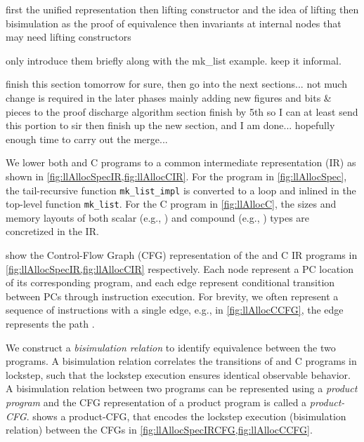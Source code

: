 first the unified representation
then lifting constructor and the idea of lifting
then bisimulation as the proof of equivalence
then invariants at internal nodes that may need lifting constructors

only introduce them briefly along with the mk\_list example.
keep it informal.

finish this section tomorrow for sure, then go into the next sections...
not much change is required in the later phases
mainly adding new figures and bits \& pieces to the proof discharge algorithm section
finish by 5th so I can at least send this portion to sir
then finish up the new section, and I am done...
hopefully enough time to carry out the merge...


We lower both \SpecL{} and C programs to a common intermediate representation (IR)
as shown in \cref{fig:llAllocSpecIR,fig:llAllocCIR}.
For the \SpecL{} program in \cref{fig:llAllocSpec},
the tail-recursive function {\tt mk\_list\_impl} is converted to a loop and
inlined in the top-level function {\tt mk\_list}.
For the C program in \cref{fig:llAllocC},
the sizes and memory layouts of both scalar (e.g., )
and compound (e.g., ) types are concretized in the IR.



 show the Control-Flow Graph (CFG) representation
of the \SpecL{} and C IR programs in \cref{fig:llAllocSpecIR,fig:llAllocCIR} respectively.
Each node represent a PC location of its corresponding program, and each edge represent
conditional transition between PCs through instruction execution.
For brevity, we often represent a sequence of instructions with a single edge, e.g.,
in \cref{fig:llAllocCCFG}, the edge  represents the path .



We construct a {\em bisimulation relation} to identify equivalence between the two programs.
A bisimulation relation correlates the transitions of \SpecL{} and C programs in lockstep, such that the
lockstep execution ensures identical observable behavior.
A bisimulation relation between two programs can be represented using a {\em product program}
\cite{covac} and the CFG representation of a product program is called a {\em product-CFG}.
 shows a product-CFG, that encodes the lockstep execution
(bisimulation relation) between the CFGs in \cref{fig:llAllocSpecIRCFG,fig:llAllocCCFG}.

